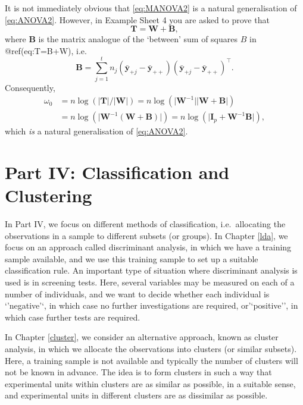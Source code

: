 \documentclass[]{book}
\theoremstyle{definition}
\theoremstyle{definition}
\theoremstyle{definition}
\theoremstyle{remark}
\begin{document}
It is not immediately obvious that \eqref{eq:MANOVA2} is a natural generalisation of \eqref{eq:ANOVA2}. However, in Example Sheet 4 you are asked to prove that
\[
\boldsymbol T=\boldsymbol W+\boldsymbol B,
\]
where \(\boldsymbol B\) is the matrix analogue of the `between' sum of squares \(B\) in @ref(eq:T=B+W), i.e.
\[
\boldsymbol B= \sum_{j=1}^t  n_j (\bar{\boldsymbol y}_{+j}-\bar{\boldsymbol y}_{++})(\bar{\boldsymbol y}_{+j}-\bar{\boldsymbol y}_{++})^\top.
\]
Consequently,
\begin{align*}
\omega_0&=n \log (\vert \boldsymbol T\vert /\vert \boldsymbol W\vert)
=n \log (\vert \boldsymbol W^{-1} \vert \vert \boldsymbol W+ \boldsymbol B\vert)\\
&=n \log (\vert \boldsymbol W^{-1}(\boldsymbol W+\boldsymbol B)\vert)
=n \log (\vert \boldsymbol I_p +\boldsymbol W^{-1} \boldsymbol B\vert),
\end{align*}
which \textit{is} a natural generalisation of \eqref{eq:ANOVA2}.

\hypertarget{part-iv-classification-and-clustering}{%
\chapter*{Part IV: Classification and Clustering}\label{part-iv-classification-and-clustering}}

In Part IV, we focus on different methods of classification,
i.e.~allocating the observations in a sample to different subsets (or
groups). In Chapter \ref{lda}, we focus on an approach called discriminant
analysis, in which we have a training sample available, and we use
this training sample to set up a suitable classification rule. An important type of situation where
discriminant analysis is used is in screening tests. Here, several variables may be measured on each of a number of
individuals, and we want to decide whether each individual is `'negative'`, in which case no further investigations are required,
or'`positive'', in which case further tests are required.

In Chapter \ref{cluster}, we consider an alternative approach, known as cluster analysis,
in which we allocate the observations into clusters (or similar subsets).
Here, a training sample is not available and typically the number of clusters will
not be known in advance. The idea is to form clusters in such a way that experimental units within clusters are as similar as possible, in a suitable sense,
and experimental units in different clusters are as dissimilar as possible.
\end{document}
